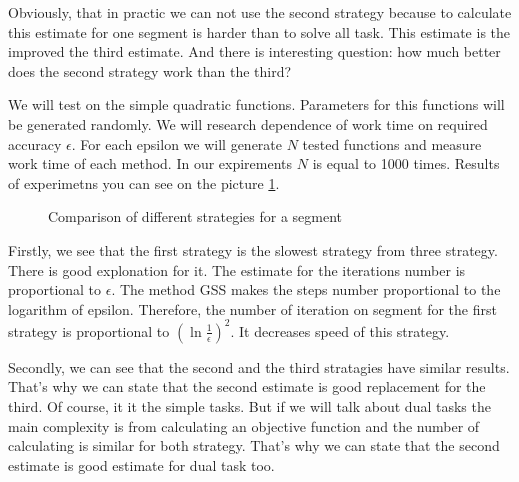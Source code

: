 \documentclass[12pt]{article}
\begin{document}
Obviously, that in practic we can not use the second strategy because to calculate this estimate for one segment is harder than to solve all task. This estimate is the improved the third estimate. And there is interesting question: how much better does the second strategy work than the third?

We will test on the simple quadratic functions. Parameters for this functions will be generated randomly. We will research dependence of work time on required accuracy $\epsilon$. For each epsilon we will generate $N$ tested functions and measure work time of each method. In our expirements $N$ is equal to 1000 times. Results of experimetns you can see on the picture \ref{res}.

\begin{figure}[h!]
\label{res}
 \caption{Comparison of different strategies for a segment}
\end{figure}

Firstly, we see that the first strategy is the slowest strategy from three strategy. There is good explonation for it. The estimate for the iterations number is proportional to $\epsilon$. The method GSS makes the steps number proportional to the logarithm of epsilon. Therefore, the number of iteration on segment for the first strategy is proportional to $(\ln \frac{1}{\epsilon})^2$. It decreases speed of this strategy. 

Secondly, we can see that the second and the third stratagies have similar results. That's why we can state that the second estimate is good replacement for the third. Of course, it it the simple tasks. But if we will talk about dual tasks the main complexity is from calculating an objective function and the number of calculating is similar for both strategy. That's why we can state that the second estimate is good estimate for dual task too.
\end{document}
